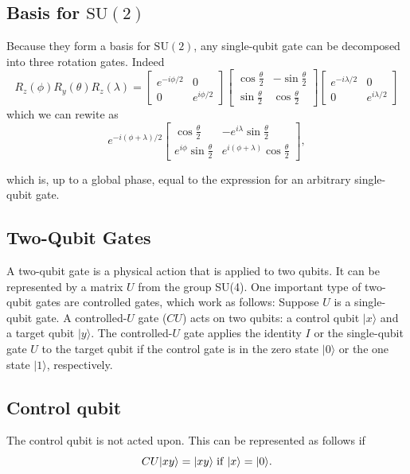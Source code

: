 \documentclass[%
oneside,                 %
final,                   %
10pt]{article}
\begin{document}
\subsection{Basis for $\mathrm{SU}(2)$}

Because they form a basis for $\mathrm{SU}(2)$, any single-qubit gate
can be decomposed into three rotation gates. Indeed
\[
R_z(\phi)R_y(\theta)R_z(\lambda)=
\begin{bmatrix}
e^{-i\phi/2} & 0 \\
0 & e^{i\phi/2}
\end{bmatrix}
\begin{bmatrix}
\cos\frac{\theta}{2} & -\sin\frac{\theta}{2} \\
\sin\frac{\theta}{2} & \cos\frac{\theta}{2} 
\end{bmatrix}
\begin{bmatrix}
e^{-i\lambda/2} & 0 \\
0 & e^{i\lambda/2}
\end{bmatrix}
\]
which we can rewite as
\[
e^{-i(\phi+\lambda)/2}
\begin{bmatrix}
\cos\frac{\theta}{2} & -e^{i\lambda}\sin\frac{\theta}{2}\\
e^{i\phi}\sin\frac{\theta}{2} & e^{i(\phi+\lambda)}\cos\frac{\theta}{2}
\end{bmatrix},
\]

which is, up to a global phase, equal to the expression for an arbitrary single-qubit gate.

\subsection{Two-Qubit Gates}

A two-qubit gate is a physical action that is applied to two
qubits. It can be represented by a matrix $U$ from the group
SU(4). One important type of two-qubit gates are controlled gates,
which work as follows: Suppose $U$ is a single-qubit gate. A
controlled-$U$ gate ($CU$) acts on two qubits: a control qubit
$\vert x \rangle $ and a target qubit $\vert y \rangle $. The controlled-$U$ gate
applies the identity $I$ or the single-qubit gate $U$ to the target
qubit if the control gate is in the zero state $\vert 0\rangle$ or the one
state $\vert 1\rangle$, respectively.

\subsection{Control qubit}
The control qubit is not acted
upon. This can be represented as follows if
\[CU\vert xy\rangle=
\vert xy\rangle \hspace{0.1cm} \mathrm{if} \hspace{0.1cm}  \vert x \rangle =\vert 0\rangle.
\]
\end{document}
